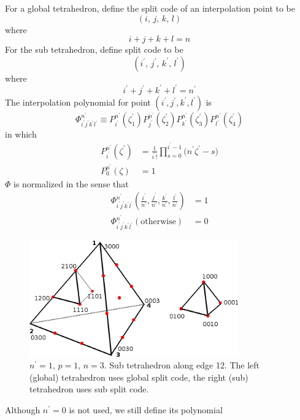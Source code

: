 \documentclass[a4paper,onecolumn]{article}
\begin{document}
For a global tetrahedron, define the split code of an interpolation point to be
$$
    (i,\,j,\,k,\,l)
$$
where
$$
    i+j+k+l=n
$$
For the sub tetrahedron, define split code to be
$$
    (i^\prime,\,j^\prime,\,k^\prime,\,l^\prime)
$$
where
$$
    i^\prime + j^\prime + k^\prime + l^\prime = n^\prime
$$
The interpolation polynomial for point $(i^\prime,j^\prime,k^\prime,l^\prime)$ is
$$
    \Phi_{i^\prime j^\prime k^\prime l^\prime}^{n^\prime} \equiv P_{i^\prime}^{n^\prime}(\zeta_1^\prime)
    P_{j^\prime}^{n^\prime}(\zeta_2^\prime) P_{k^\prime}^{n^\prime}(\zeta_3^\prime) P_{l^\prime}^{n^\prime}(\zeta_4^\prime)
$$
in which
\begin{equation*}\begin{split}
    P_{i^\prime}^{n^\prime}(\zeta^\prime) &= \frac{1}{i^\prime!}\prod_{s=0}^{i^\prime-1} \bigl( n^\prime \zeta^\prime - s \bigr)\\
    P_0^{n^\prime}(\zeta) &= 1
\end{split}\end{equation*}
$\Phi$ is normalized in the sense that
\begin{equation*}\begin{split}
    \Phi_{i^\prime j^\prime k^\prime l^\prime }^{n^\prime}(\frac{i^\prime}{n^\prime},\frac{j^\prime}{n^\prime},\frac{k^\prime}{n^\prime},\frac{l^\prime}{n^\prime}) &= 1\\
    \Phi_{i^\prime j^\prime k^\prime l^\prime }^{n^\prime}(\textrm{otherwise}) &=0
\end{split}\end{equation*}
\begin{figure}\begin{center}
    \includegraphics[height=5cm]{subtetraindex.png}
    \caption{$n^\prime=1$, $p=1$, $n=3$. Sub tetrahedron along edge 12. The left (global) tetrahedron uses global split code,
    the right (sub) tetrahedron uses sub split code.}
\end{center}\end{figure}
Although $n^\prime=0$ is not used, we still define its polynomial
\end{document}
